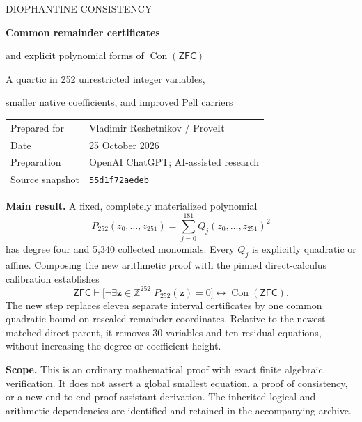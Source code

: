 \documentclass[11pt,letterpaper]{article}
\theoremstyle{remark}\newtheorem{remark}[theorem]{Remark}
\newcommand{\Z}{\mathbb Z}\newcommand{\N}{\mathbb N}
\newcommand{\Con}{\operatorname{Con}}\newcommand{\ZFC}{\mathsf{ZFC}}
\begin{document}
\hypersetup{pageanchor=false}
\begin{titlepage}
\vspace*{0.6in}
{\Large\color{MidnightBlue} DIOPHANTINE CONSISTENCY}\par
\vspace{0.35in}
{\huge\bfseries Common remainder certificates\par}
\vspace{0.13in}
{\LARGE and explicit polynomial forms of $\Con(\ZFC)$\par}
\vspace{0.4in}
{\large A quartic in 252 unrestricted integer variables,\par
smaller native coefficients, and improved Pell carriers}\par
\vspace{0.45in}
\begin{tabular}{@{}ll@{}}
Prepared for & Vladimir Reshetnikov / ProveIt\\
Date & 25 October 2026\\
Preparation & OpenAI ChatGPT; AI-assisted research\\
Source snapshot & \texttt{55d1f72aedeb}\\
\end{tabular}\par
\vspace{0.45in}
\begin{minipage}{0.94\linewidth}
\textbf{Main result.} A fixed, completely materialized polynomial
\[
 P_{252}(z_0,\ldots,z_{251})=\sum_{j=0}^{181}Q_j(z_0,\ldots,z_{251})^2
\]
has degree four and 5,340 collected monomials. Every $Q_j$ is explicitly
quadratic or affine. Composing the new arithmetic proof with the pinned
direct-calculus calibration establishes
\[
 \ZFC\vdash
 \bigl[\neg\exists\mathbf z\in\Z^{252}\;P_{252}(\mathbf z)=0\bigr]
 \longleftrightarrow \Con(\ZFC).
\]
The new step replaces eleven separate interval certificates by one common
quadratic bound on rescaled remainder coordinates. Relative to the newest
matched direct parent, it removes 30 variables and ten residual equations,
without increasing the degree or coefficient height.
\end{minipage}
\vfill
\textbf{Scope.} This is an ordinary mathematical proof with exact finite
algebraic verification. It does not assert a global smallest equation,
a proof of consistency, or a new end-to-end proof-assistant derivation.
The inherited logical and arithmetic dependencies are identified and
retained in the accompanying archive.
\end{titlepage}
\hypersetup{pageanchor=true}
\end{document}

